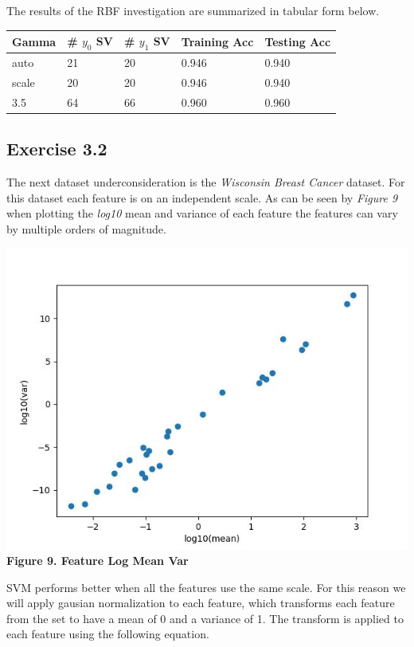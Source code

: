 \documentclass[11pt]{article}
\begin{document}
The results of the RBF investigation are summarized in tabular form
below.

\begin{longtable}[]{@{}lllll@{}}
\toprule
Gamma & \# \(y_{0}\) SV & \# \(y_{1}\) SV & Training Acc & Testing
Acc \\
\midrule
\endhead
auto & 21 & 20 & 0.946 & 0.940 \\
scale & 20 & 20 & 0.946 & 0.940 \\
3.5 & 64 & 66 & 0.960 & 0.960 \\
\bottomrule
\end{longtable}

    \hypertarget{exercise-3.2}{%
\subsection{Exercise 3.2}\label{exercise-3.2}}

The next dataset underconsideration is the \emph{Wisconsin Breast
Cancer} dataset. For this dataset each feature is on an independent
scale. As can be seen by \emph{Figure 9} when plotting the \emph{log10}
mean and variance of each feature the features can vary by multiple
orders of magnitude.

\includegraphics{figures/3_2_log_mean_var.jpg}\\
\textbf{Figure 9. Feature Log Mean Var}

SVM performs better when all the features use the same scale. For this
reason we will apply gausian normalization to each feature, which
transforms each feature from the set to have a mean of 0 and a variance
of 1. The transform is applied to each feature using the following
equation.
\end{document}
